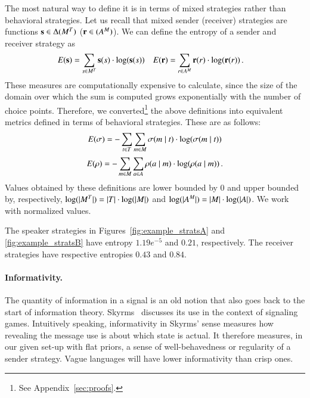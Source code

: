The most natural way to define it is in terms of mixed strategies
rather than behavioral strategies.  Let us recall that mixed sender
(receiver) strategies are functions $\mathrm{\mathbf{s}} \in
\Delta(M^T)$ ($\mathrm{\mathbf{r}} \in (A^M)$).  We can
define the entropy of a sender and receiver strategy as
\begin{align*}
  E(\mathrm{\mathbf{s}}) & = \sum_{s \in M^T} \mathrm{\mathbf{s}}(s) \cdot
  \log(\mathrm{\mathbf{s}}(s)) & 
  E(\mathrm{\mathbf{r}}) & = \sum_{r \in A^M} \mathrm{\mathbf{r}}(r) \cdot \log(\mathrm{\mathbf{r}}(r)) \,.
\end{align*} 
These measures are computationally expensive to calculate, since the
size of the domain over which the sum is computed grows exponentially
with the number of choice points.  Therefore, we
converted\footnote{See Appendix~\ref{sec:proofs}.} the above definitions into equivalent metrics defined in
terms of behavioral strategies.  These are as follows:
\begin{align*}
  E(\sigma) = -\sum_{t \in T} \sum_{m \in M}
  \sigma(m \mid t) \cdot \log(\sigma(m \mid
  t)) 
\end{align*} 
\begin{align*}
  E(\rho) = -\sum_{m \in M} \sum_{a \in A}
  \rho(a \mid m) \cdot \log(\rho(a \mid
  m)) \,. 
\end{align*}
Values obtained by these definitions are lower bounded by $0$ and
upper bounded by, respectively, $\log(|M^T|) = |T|
\cdot \log(|M|)$ and $\log(|A^M|) = |M| \cdot
\log(|A|)$. We work with normalized values. 

The speaker strategies in Figures~\ref{fig:example_stratsA} and
\ref{fig:example_stratsB} have entropy $1.19e^{-5}$ and $0.21$,
respectively. The receiver strategies have respective entropies $0.43$
and $0.84$.



\paragraph{Informativity.} The quantity of information in a signal is
an old notion that also goes back to the start of information theory.
Skyrms~\citet[ch.~3]{Skyrms2010:Signals} discusses its use in the
context of signaling games. Intuitively speaking, informativity in
Skyrms' sense measures how revealing the message use is about which
state is actual. It therefore measures, in our given set-up with flat
priors, a sense of well-behavedness or regularity of a sender
strategy. Vague languages will have lower informativity than crisp
ones. 

